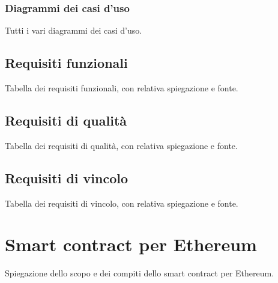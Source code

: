 \subsubsection{Diagrammi dei casi d'uso}
Tutti i vari diagrammi dei casi d'uso.





\subsection{Requisiti funzionali}
Tabella dei requisiti funzionali, con relativa spiegazione e fonte.

\subsection{Requisiti di qualità}
Tabella dei requisiti di qualità, con relativa spiegazione e fonte.

\subsection{Requisiti di vincolo}
Tabella dei requisiti di vincolo, con relativa spiegazione e fonte.


\section{Smart contract per Ethereum}
Spiegazione dello scopo e dei compiti dello smart contract per Ethereum.

